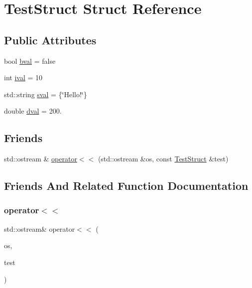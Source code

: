 \hypertarget{structTestStruct}{}\section{Test\+Struct Struct Reference}
\label{structTestStruct}
\subsection*{Public Attributes}
\begin{DoxyCompactItemize}
\item 
bool \hyperlink{structTestStruct_a8046d4d71123786bfc45df4c0d666ac0}{bval} = false
\item 
int \hyperlink{structTestStruct_a6ad834e72192d4caf38c772026422f26}{ival} = 10
\item 
std\+::string \hyperlink{structTestStruct_abaea5499c492a99472f0a2fd50b95cb7}{sval} = \{\char`\"{}Hello!\char`\"{}\}
\item 
double \hyperlink{structTestStruct_ab11940f6d564fb45b0baab4fe4c82493}{dval} = 200.
\end{DoxyCompactItemize}
\subsection*{Friends}
\begin{DoxyCompactItemize}
\item 
std\+::ostream \& \hyperlink{structTestStruct_aa4cb1a404b9118bfe3334ca8747d0851}{operator$<$$<$} (std\+::ostream \&os, const \hyperlink{structTestStruct}{Test\+Struct} \&test)
\end{DoxyCompactItemize}


\subsection{Friends And Related Function Documentation}
\mbox{\label{structTestStruct_aa4cb1a404b9118bfe3334ca8747d0851}} 
\subsubsection{\texorpdfstring{operator$<$$<$}{operator<<}}
{\footnotesize\ttfamily std\+::ostream\& operator$<$$<$ (\begin{DoxyParamCaption}\item[{std\+::ostream \&}]{os,  }\item[{const \hyperlink{structTestStruct}{Test\+Struct} \&}]{test }\end{DoxyParamCaption})\hspace{0.3cm}{\ttfamily [friend]}}



